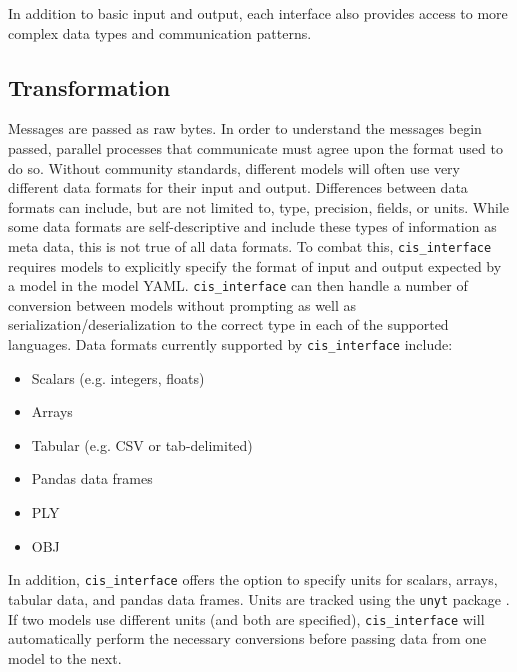 \documentclass[journal]{IEEEtran}
\newcommand{\cis}{{\tt cis\_interface}{}}
\begin{document}
In addition to basic input and output, each interface also provides access 
to more complex data types and communication patterns.


%
\subsection{Transformation}\label{SS:transformation}
%
%
Messages are passed as raw bytes. In order to understand the messages begin passed, parallel processes that communicate must agree upon the format used to do so. Without community standards, different models will often use very different data formats for their input and output. Differences between data formats can include, but are not limited to, type, precision, fields, or units. While some data formats are self-descriptive and include these types of information as meta data, this is not true of all data formats. To combat this, {\cis} requires models to explicitly specify the format of input and output expected by a model in the model YAML. {\cis} can then handle a number of conversion between models without prompting as well as serialization/deserialization to the correct type in each of the supported languages. Data formats currently supported by {\cis} include:
%
\begin{itemize}
	\item Scalars (e.g. integers, floats)
	\item Arrays
	\item Tabular (e.g. CSV or tab-delimited)
	\item Pandas data frames
	\item PLY
	\item OBJ
\end{itemize}

%
In addition, {\cis} offers the option to specify units for scalars, arrays, tabular data, and pandas data frames. Units are tracked using the {\tt unyt} package \citep{Goldbaum2018}. If two models use different units (and both are specified), {\cis} will automatically perform the necessary conversions before passing data from one model to the next.
\end{document}
